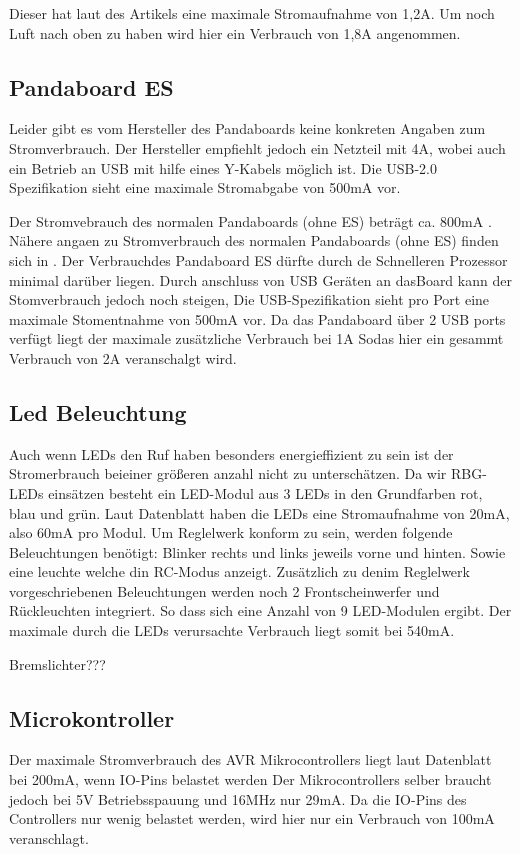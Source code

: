Dieser hat laut des Artikels eine maximale Stromaufnahme von 1,2A. Um noch Luft nach oben zu haben wird hier ein Verbrauch von 
1,8A angenommen.

\subsection{Pandaboard ES}
Leider gibt es vom Hersteller des Pandaboards keine konkreten Angaben zum Stromverbrauch. Der Hersteller empfiehlt jedoch ein
Netzteil mit 4A\cite{website-panda-supply}, wobei auch ein Betrieb an USB mit hilfe eines Y-Kabels möglich ist. Die USB-2.0 Spezifikation\cite{website-usb-spec} sieht eine maximale 
Stromabgabe von 500mA vor.

Der Stromvebrauch des normalen Pandaboards (ohne ES) beträgt ca. 800mA \cite{website-panda-power}.
Nähere angaen zu Stromverbrauch des normalen Pandaboards (ohne ES) finden sich in \cite{website-panda-power}.
Der Verbrauchdes Pandaboard ES dürfte durch de Schnelleren Prozessor minimal darüber liegen. 
Durch anschluss von USB Geräten an dasBoard kann der Stomverbrauch jedoch noch steigen, Die USB-Spezifikation \cite{website-usb-spec}
sieht pro Port eine maximale Stomentnahme von 500mA vor. Da das Pandaboard über 2 USB ports verfügt liegt der maximale zusätzliche Verbrauch bei 1A
Sodas hier ein gesammt Verbrauch von 2A veranschalgt wird.

\subsection{Led Beleuchtung}
Auch wenn LEDs den Ruf haben besonders energieffizient zu sein ist der Stromerbrauch beieiner größeren anzahl nicht zu
unterschätzen. Da wir RBG-LEDs einsätzen besteht ein LED-Modul aus 3 LEDs in den Grundfarben rot, blau und grün.
Laut Datenblatt \cite{ds-WS2812} haben die LEDs eine Stromaufnahme von 20mA, also 60mA pro Modul.
Um Reglelwerk konform zu sein, werden folgende Beleuchtungen benötigt: Blinker rechts und links jeweils vorne und hinten.
Sowie eine leuchte welche din RC-Modus anzeigt. Zusätzlich zu denim Reglelwerk vorgeschriebenen Beleuchtungen werden noch
2 Frontscheinwerfer und Rückleuchten integriert. So dass sich eine Anzahl von 9 LED-Modulen ergibt.
Der maximale durch die LEDs verursachte Verbrauch liegt somit bei 540mA. 



Bremslichter???


\subsection{Microkontroller}
Der maximale Stromverbrauch des AVR Mikrocontrollers liegt laut Datenblatt\cite{ds-at90can} bei 200mA, wenn IO-Pins belastet werden
Der Mikrocontrollers selber braucht jedoch bei 5V Betriebsspauung und 16MHz nur 29mA. Da die IO-Pins des Controllers nur wenig belastet werden,
wird hier nur ein Verbrauch von 100mA veranschlagt.

